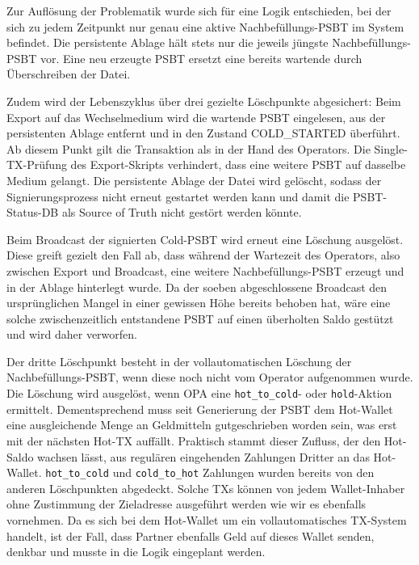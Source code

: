 Zur Auflösung der Problematik wurde sich für eine Logik entschieden, bei der sich zu jedem Zeitpunkt nur genau eine aktive Nachbefüllungs-\ac{PSBT} im System befindet. Die persistente Ablage hält stets nur die jeweils jüngste Nachbefüllungs-\ac{PSBT} vor. Eine neu erzeugte \ac{PSBT} ersetzt eine bereits wartende durch Überschreiben der Datei.

Zudem wird der Lebenszyklus über drei gezielte Löschpunkte abgesichert:
Beim Export auf das Wechselmedium wird die wartende \ac{PSBT} eingelesen, aus der persistenten Ablage entfernt und in den Zustand \linebreak COLD\_STARTED überführt. Ab diesem Punkt gilt die Transaktion als in der Hand des Operators. Die Single-\ac{TX}-Prüfung des Export-Skripts verhindert, dass eine weitere \ac{PSBT} auf dasselbe Medium gelangt. Die persistente Ablage der Datei wird gelöscht, sodass der Signierungsprozess nicht erneut gestartet werden kann und damit die \ac{PSBT}-Status-\ac{DB} als Source of Truth nicht gestört werden könnte.

Beim Broadcast der signierten Cold-\ac{PSBT} wird erneut eine Löschung ausgelöst. Diese greift gezielt den Fall ab, dass während der Wartezeit des Operators, also zwischen Export und Broadcast, eine weitere Nachbefüllungs-\ac{PSBT} erzeugt und in der Ablage hinterlegt wurde. Da der soeben abgeschlossene Broadcast den ursprünglichen Mangel in einer gewissen Höhe bereits behoben hat, wäre eine solche zwischenzeitlich entstandene \ac{PSBT} auf einen überholten Saldo gestützt und wird daher verworfen.

Der dritte Löschpunkt besteht in der vollautomatischen Löschung der Nachbefüllungs-\ac{PSBT}, wenn diese noch nicht vom Operator aufgenommen wurde. Die Löschung wird ausgelöst, wenn \ac{OPA} eine \texttt{hot\_to\_cold}- oder \texttt{hold}-Aktion ermittelt. Dementsprechend muss seit Generierung der \ac{PSBT} dem Hot-Wallet eine ausgleichende Menge an Geldmitteln gutgeschrieben worden sein, was erst mit der nächsten Hot-\ac{TX} auffällt.
Praktisch stammt dieser Zufluss, der den Hot-Saldo wachsen lässt, aus regulären eingehenden Zahlungen Dritter an das Hot-Wallet. \texttt{hot\_to\_cold} und \texttt{cold\_to\_hot} Zahlungen wurden bereits von den anderen Löschpunkten abgedeckt.
Solche \acp{TX} können von jedem Wallet-Inhaber ohne Zustimmung der Zieladresse ausgeführt werden wie wir es ebenfalls vornehmen. Da es sich bei dem Hot-Wallet um ein vollautomatisches \ac{TX}-System handelt, ist der Fall, dass Partner ebenfalls Geld auf dieses Wallet senden, denkbar und musste in die Logik eingeplant werden.

